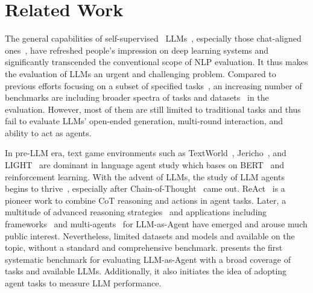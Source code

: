 \section{Related Work}
The general capabilities of self-supervised~\citep{liu2021self} LLMs~\citep{GPT3,chowdhery2022palm,zhang2022opt,scao2022bloom,zeng2022glm,touvron2023llama}, especially those chat-aligned ones~\citep{ouyang2022training,Claude,openai2023gpt}, have refreshed people's impression on deep learning systems and significantly transcended the conventional scope of NLP evaluation.
It thus makes the evaluation of LLMs an urgent and challenging problem.
Compared to previous efforts focusing on a subset of specified tasks~\citep{wang2019superglue,wangglue,gehrmann2021gem}, an increasing number of benchmarks are including broader spectra of tasks and datasets~\citep{hendrycksmeasuring,liang2022holistic,srivastava2023beyond} in the evaluation.
However, most of them are still limited to traditional tasks and thus fail to evaluate LLMs' open-ended generation, multi-round interaction, and ability to act as agents.

In pre-LLM era, text game environments such as TextWorld~\citep{cote2019textworld}, Jericho~\citep{hausknecht2020interactive}, and LIGHT~\citep{urbanek2019learning} are dominant in language agent study which bases on BERT~\citep{devlin2019bert} and reinforcement learning.
With the advent of LLMs, the study of LLM agents begins to thrive~\citep{huang2022language}, especially after Chain-of-Thought~\citep{wei2022chain} came out.
ReAct~\citep{yao2023react} is a pioneer work to combine CoT reasoning and actions in agent tasks.
Later, a multitude of advanced reasoning strategies~\citep{kim2023language,shinn2023reflexion,wang2023describe,liu2023llm+,yao2023tree,gu-etal-2023-dont} and applications including frameworks~\citep{richards2023auto,nakajima2023babyagi,agentgpt} and multi-agents~\citep{Park2023GenerativeAI,Hong2023MetaGPTMP,Wu2023AutoGenEN} for LLM-as-Agent have emerged and arouse much public interest.
Nevertheless, limited datasets and models and available on the topic, without a standard and comprehensive benchmark.
\model presents the first systematic benchmark for evaluating LLM-as-Agent with a broad coverage of tasks and available LLMs.
Additionally, it also initiates the idea of adopting agent tasks to measure LLM performance.

